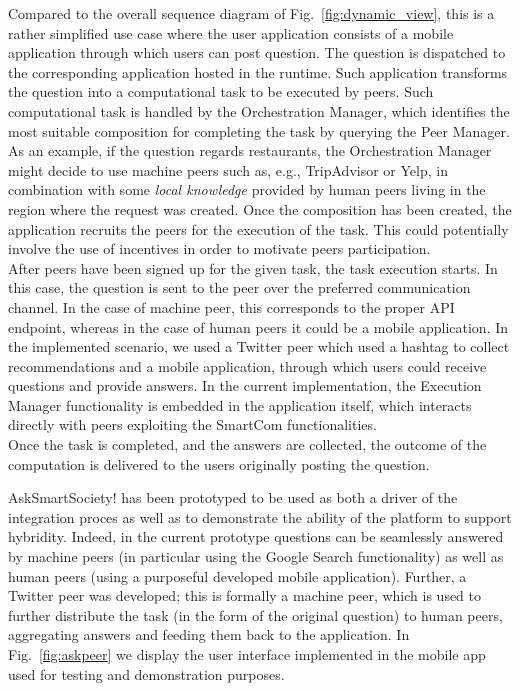 Compared to the overall sequence diagram of Fig.~\ref{fig:dynamic_view}, this is a rather simplified use case where the user application consists of a mobile application through which users can post question. The question is dispatched to the corresponding application hosted in the runtime. Such application transforms the question into a computational task to be executed by peers. Such computational task is handled by the Orchestration Manager, which identifies the most suitable composition for completing the task by querying the Peer Manager. As an example, if the question regards restaurants, the Orchestration Manager might decide to use machine peers such as, e.g., TripAdvisor or Yelp, in combination with some \textit{local knowledge} provided by human peers living in the region where the request was created. Once the composition has been created, the application recruits the peers for the execution of the task. This could potentially involve the use of incentives in order to motivate peers participation.\\
After peers have been signed up for the given task, the task execution starts. In this case, the question is sent to the peer over the preferred communication channel. In the case of machine peer, this corresponds to the proper API endpoint, whereas in the case of human peers it could be a mobile application. In the implemented scenario, we used a Twitter peer which used a hashtag to collect recommendations and a mobile application, through which users could receive questions and provide answers. In the current implementation, the Execution Manager functionality is embedded in the application itself, which interacts directly with peers exploiting the SmartCom functionalities.\\
Once the task is completed, and the answers are collected, the outcome of the computation is delivered to the users originally posting the question.

AskSmartSociety! has been prototyped to be used as both a driver of the integration proces as well as to demonstrate the ability of the platform to support hybridity. Indeed, in the current prototype questions can be seamlessly answered by machine peers (in particular using the Google Search functionality) as well as human peers (using a purposeful developed mobile application). Further, a Twitter peer was developed; this is formally a machine peer, which is used to further distribute the task (in the form of the original question) to human peers, aggregating answers and feeding them back to the application. In Fig.~\ref{fig:askpeer} we display the user interface implemented in the mobile app used for testing and demonstration purposes. 


